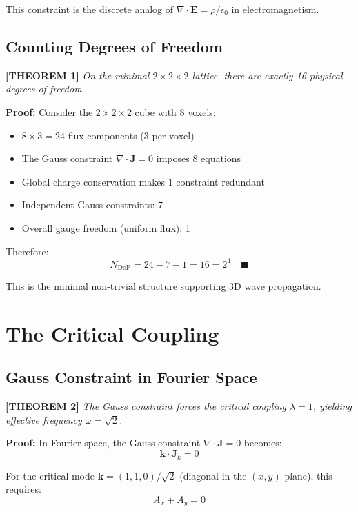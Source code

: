 \documentclass[aps,prd,twocolumn,10pt,groupedaddress,superscriptaddress]{revtex4-2}
\begin{document}
This constraint is the discrete analog of $\nabla \cdot \mathbf{E} = \rho/\epsilon_0$ in electromagnetism.

\subsection{Counting Degrees of Freedom}

\textbf{[THEOREM 1]} \textit{On the minimal $2\times2\times2$ lattice, there are exactly 16 physical degrees of freedom.}

\textbf{Proof:} Consider the $2\times2\times2$ cube with 8 voxels:
\begin{itemize}
\item $8 \times 3 = 24$ flux components (3 per voxel)
\item The Gauss constraint $\nabla \cdot \mathbf{J} = 0$ imposes 8 equations
\item Global charge conservation makes 1 constraint redundant
\item Independent Gauss constraints: 7
\item Overall gauge freedom (uniform flux): 1
\end{itemize}

Therefore:
\begin{equation}
N_{\text{DoF}} = 24 - 7 - 1 = 16 = 2^4 \quad \blacksquare
\end{equation}

This is the minimal non-trivial structure supporting 3D wave propagation.

\section{The Critical Coupling}

\subsection{Gauss Constraint in Fourier Space}

\textbf{[THEOREM 2]} \textit{The Gauss constraint forces the critical coupling $\lambda = 1$, yielding effective frequency $\omega = \sqrt{2}$.}

\textbf{Proof:} In Fourier space, the Gauss constraint $\nabla \cdot \mathbf{J} = 0$ becomes:
\begin{equation}
\mathbf{k} \cdot \mathbf{J}_k = 0
\end{equation}

For the critical mode $\mathbf{k} = (1, 1, 0)/\sqrt{2}$ (diagonal in the $(x,y)$ plane), this requires:
\begin{equation}
A_x + A_y = 0
\end{equation}
\end{document}
